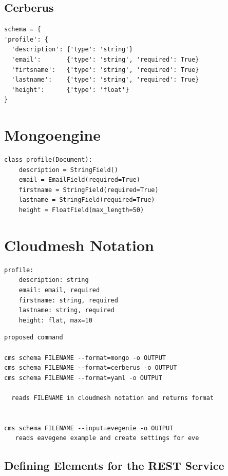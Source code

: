 \documentclass[9pt,twocolumn,twoside]{styles/osajnl}
\begin{document}
\subsection{Cerberus}

\begin{Verbatim}
schema = {
'profile': {
  'description': {'type': 'string'}
  'email':       {'type': 'string', 'required': True}
  'firtsname':   {'type': 'string', 'required': True}
  'lastname':    {'type': 'string', 'required': True}
  'height':      {'type': 'float'}
}
\end{Verbatim}

\section{Mongoengine}

\begin{Verbatim}
class profile(Document):
    description = StringField()
    email = EmailField(required=True)
    firstname = StringField(required=True)
    lastname = StringField(required=True)
    height = FloatField(max_length=50)
\end{Verbatim}

\section{Cloudmesh Notation}

\begin{Verbatim}
profile:
    description: string
    email: email, required
    firstname: string, required
    lastname: string, required
    height: flat, max=10
\end{Verbatim}

\begin{Verbatim}
proposed command

cms schema FILENAME --format=mongo -o OUTPUT
cms schema FILENAME --format=cerberus -o OUTPUT
cms schema FILENAME --format=yaml -o OUTPUT

  reads FILENAME in cloudmesh notation and returns format


cms schema FILENAME --input=evegenie -o OUTPUT
   reads eavegene example and create settings for eve
\end{Verbatim}


\subsection{Defining Elements for the REST Service}
\end{document}
